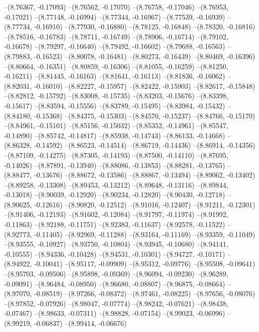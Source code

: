 --(8.76367, -0.17093)
--(8.76562, -0.17070)
--(8.76758, -0.17046)
--(8.76953, -0.17021)
--(8.77148, -0.16994)
--(8.77344, -0.16967)
--(8.77539, -0.16939)
--(8.77734, -0.16910)
--(8.77930, -0.16880)
--(8.78125, -0.16848)
--(8.78320, -0.16816)
--(8.78516, -0.16783)
--(8.78711, -0.16749)
--(8.78906, -0.16714)
--(8.79102, -0.16678)
--(8.79297, -0.16640)
--(8.79492, -0.16602)
--(8.79688, -0.16563)
--(8.79883, -0.16523)
--(8.80078, -0.16481)
--(8.80273, -0.16439)
--(8.80469, -0.16396)
--(8.80664, -0.16351)
--(8.80859, -0.16306)
--(8.81055, -0.16259)
--(8.81250, -0.16211)
--(8.81445, -0.16163)
--(8.81641, -0.16113)
--(8.81836, -0.16062)
--(8.82031, -0.16010)
--(8.82227, -0.15957)
--(8.82422, -0.15903)
--(8.82617, -0.15848)
--(8.82812, -0.15792)
--(8.83008, -0.15735)
--(8.83203, -0.15676)
--(8.83398, -0.15617)
--(8.83594, -0.15556)
--(8.83789, -0.15495)
--(8.83984, -0.15432)
--(8.84180, -0.15368)
--(8.84375, -0.15303)
--(8.84570, -0.15237)
--(8.84766, -0.15170)
--(8.84961, -0.15101)
--(8.85156, -0.15032)
--(8.85352, -0.14961)
--(8.85547, -0.14890)
--(8.85742, -0.14817)
--(8.85938, -0.14743)
--(8.86133, -0.14668)
--(8.86328, -0.14592)
--(8.86523, -0.14514)
--(8.86719, -0.14436)
--(8.86914, -0.14356)
--(8.87109, -0.14275)
--(8.87305, -0.14193)
--(8.87500, -0.14110)
--(8.87695, -0.14026)
--(8.87891, -0.13940)
--(8.88086, -0.13853)
--(8.88281, -0.13765)
--(8.88477, -0.13676)
--(8.88672, -0.13586)
--(8.88867, -0.13494)
--(8.89062, -0.13402)
--(8.89258, -0.13308)
--(8.89453, -0.13212)
--(8.89648, -0.13116)
--(8.89844, -0.13018)
--(8.90039, -0.12920)
--(8.90234, -0.12820)
--(8.90430, -0.12718)
--(8.90625, -0.12616)
--(8.90820, -0.12512)
--(8.91016, -0.12407)
--(8.91211, -0.12301)
--(8.91406, -0.12193)
--(8.91602, -0.12084)
--(8.91797, -0.11974)
--(8.91992, -0.11863)
--(8.92188, -0.11751)
--(8.92383, -0.11637)
--(8.92578, -0.11522)
--(8.92773, -0.11405)
--(8.92969, -0.11288)
--(8.93164, -0.11169)
--(8.93359, -0.11049)
--(8.93555, -0.10927)
--(8.93750, -0.10804)
--(8.93945, -0.10680)
--(8.94141, -0.10555)
--(8.94336, -0.10428)
--(8.94531, -0.10301)
--(8.94727, -0.10171)
--(8.94922, -0.10041)
--(8.95117, -0.09909)
--(8.95312, -0.09776)
--(8.95508, -0.09641)
--(8.95703, -0.09506)
--(8.95898, -0.09369)
--(8.96094, -0.09230)
--(8.96289, -0.09091)
--(8.96484, -0.08950)
--(8.96680, -0.08807)
--(8.96875, -0.08664)
--(8.97070, -0.08519)
--(8.97266, -0.08372)
--(8.97461, -0.08225)
--(8.97656, -0.08076)
--(8.97852, -0.07926)
--(8.98047, -0.07774)
--(8.98242, -0.07621)
--(8.98438, -0.07467)
--(8.98633, -0.07311)
--(8.98828, -0.07154)
--(8.99023, -0.06996)
--(8.99219, -0.06837)
--(8.99414, -0.06676)
